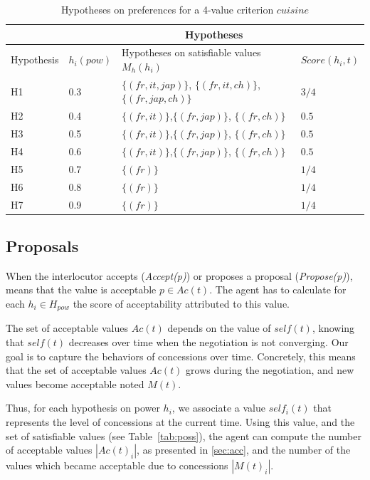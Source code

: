 \documentclass[conference, letterpaper]{IEEEtran}
\begin{document}
		\begin{table}[h]
			\centering
			\caption{Hypotheses on preferences for a 4-value criterion $cuisine$}
			\begin{tabular}{ |p{1.4cm}|p{1cm}|p{3.2cm}|p{1.8cm}|}
				\hline
				& \multicolumn{3}{c|}{Hypotheses}  \\
				\hline
				Hypothesis & $h_i(pow)$ & Hypotheses on satisfiable values $ M_h(h_i)$ & $Score(h_i,t)$\\
				\hline
				H1&0.3&$\{(fr,it,jap)\}$, $\{(fr,it,ch)\}$, $\{(fr,jap,ch)\}$ & $3/4$ \\
				\hline
				H2&0.4&$\{(fr,it)\}$,$\{(fr,jap)\}$, $\{(fr,ch)\}$ & $0.5$ \\
				\hline
				H3&0.5&$\{(fr,it)\}$,$\{(fr,jap)\}$, $\{(fr,ch)\}$ & $0.5$\\
				\hline
				H4&0.6&$\{(fr,it)\}$,$\{(fr,jap)\}$, $\{(fr,ch)\}$& $0.5$ \\
				\hline
				H5&0.7&$\{(fr)\}$ & $1/4$\\
				\hline
				H6&0.8&$\{(fr)\}$ &$1/4$\\
				\hline
				
				H7&0.9&$\{(fr)\}$ &$1/4$\\
				\hline
			\end{tabular}		
			\label{tab:update_hyp}
		\end{table}
	
	\subsection{Proposals}
		When the interlocutor accepts (\emph{Accept(p)}) or proposes a proposal (\emph{Propose(p)}), means that the value is acceptable $p \in Ac(t)$. 
		The agent has to calculate for each $h_i \in H_{pow}$ the score of acceptability attributed to this value. 
		
		The set of acceptable values $Ac(t)$ depends on the value of $self(t)$, knowing that $self(t)$ decreases over time when the negotiation is not converging. Our goal is to capture the behaviors of concessions over time. Concretely, this means that the set of acceptable values $Ac(t)$ grows during the negotiation, and new values become acceptable noted $M(t)$. 
		
		Thus, for each hypothesis on power $h_i$, we associate a value $self_i(t)$ that represents the level of concessions at the current time. Using this value, and the set of satisfiable values (see Table~\ref{tab:poss}), the agent can compute the number of acceptable values $|Ac(t)_i|$, as presented in \ref{sec:acc}, and the number of the values which became acceptable due to concessions $|M(t)_i|$.
		
\end{document}
